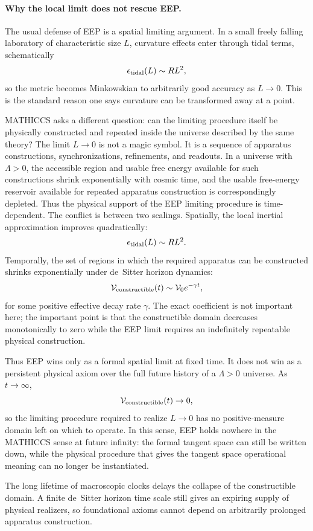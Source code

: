 \documentclass[11pt,a4paper]{article}
\begin{document}
\paragraph{Why the local limit does not rescue EEP.}

The usual defense of EEP is a spatial limiting argument. In a small freely falling laboratory of characteristic size $L$, curvature effects enter through tidal terms, schematically
\[
\epsilon_{\rm tidal}(L) \sim R L^2,
\]
so the metric becomes Minkowskian to arbitrarily good accuracy as $L\to0$. This is the standard reason one says curvature can be transformed away at a point.

MATHICCS asks a different question: can the limiting procedure itself be physically constructed and repeated inside the universe described by the same theory? The limit $L\to0$ is not a magic symbol. It is a sequence of apparatus constructions, synchronizations, refinements, and readouts. In a universe with $\Lambda>0$, the accessible region and usable free energy available for such constructions shrink exponentially with cosmic time, and the usable free-energy reservoir available for repeated apparatus construction is correspondingly depleted. Thus the physical support of the EEP limiting procedure is time-dependent. The conflict is between two scalings. Spatially, the local inertial approximation improves quadratically:
\[
\epsilon_{\rm tidal}(L)\sim R L^2.
\]
Temporally, the set of regions in which the required apparatus can be constructed shrinks exponentially under de~Sitter horizon dynamics:
\[
\mathcal{V}_{\rm constructible}(t)\sim \mathcal{V}_0 e^{-\gamma t},
\]
for some positive effective decay rate $\gamma$. The exact coefficient is not important here; the important point is that the constructible domain decreases monotonically to zero while the EEP limit requires an indefinitely repeatable physical construction.

Thus EEP wins only as a formal spatial limit at fixed time. It does not win as a persistent physical axiom over the full future history of a $\Lambda>0$ universe. As $t\to\infty$,
\[
\mathcal{V}_{\rm constructible}(t)\to0,
\]
so the limiting procedure required to realize $L\to0$ has no positive-measure domain left on which to operate. In this sense, EEP holds nowhere in the MATHICCS sense at future infinity: the formal tangent space can still be written down, while the physical procedure that gives the tangent space operational meaning can no longer be instantiated.

The long lifetime of macroscopic clocks delays the collapse of the constructible domain. A finite de~Sitter horizon time scale still gives an expiring supply of physical realizers, so foundational axioms cannot depend on arbitrarily prolonged apparatus construction.
\end{document}
